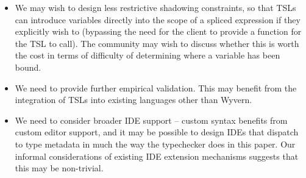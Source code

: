 \begin{itemize}
\item We may wish to design less restrictive shadowing constraints, so that TSLs can introduce variables directly into the scope of a spliced expression if they explicitly wish to (bypassing the need for the client to provide a function for the TSL to call). The community may wish to discuss whether this is worth the cost in terms of difficulty of determining where a variable has been bound.
\item We need to provide further empirical validation. This may benefit from the integration of TSLs into existing languages other than Wyvern.
\item We need to consider broader IDE support -- custom syntax benefits from custom editor support, and it may be possible to design IDEs that dispatch to type metadata in much the way the typechecker does in this paper. Our informal considerations of existing IDE extension mechanisms suggests that this may be non-trivial.
\end{itemize}

%
%
%

